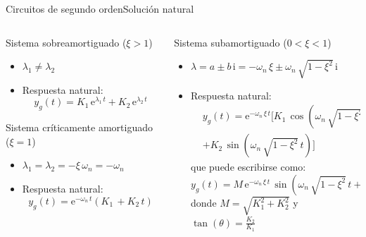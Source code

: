 \documentclass[aspectratio=169, xcolor={usenames,svgnames,dvipsnames}]{beamer}
\begin{document}
\begin{frame}{Circuitos de segundo orden}{Solución natural}
\begin{columns}
\begin{column}{0.5\linewidth}
\begin{center}
  \alert{Sistema sobreamortiguado ($\xi>1$)}
  \begin{itemize}
      \item $\lambda_1\neq\lambda_2$
      \item Respuesta natural:
      \begin{equation*}
	 y_g(t)=K_1\,\mathrm{e}^{\lambda_1\,t}+K_2\,\mathrm{e}^{\lambda_2\,t}   
	\end{equation*}
  \end{itemize}

\alert{Sistema críticamente amortiguado ($\xi=1$)}  
\begin{itemize}
    \item $\lambda_1=\lambda_2=-\xi\,\omega_n=-\omega_n$
    \item Respuesta natural: 
    \begin{equation*}
	 y_g(t)=\mathrm{e}^{-\omega_n\,t}(K_1\,+K_2\,t)   
	\end{equation*}
\end{itemize}
\end{center}
\end{column}
\begin{column}{0.5\linewidth}
\begin{center}
    \alert{Sistema subamortiguado ($0<\xi<1$)}
\begin{itemize}
    \item $\lambda=a\pm b\,\mathrm{i}=-\omega_n\,\xi\pm \omega_n\,\sqrt{1-\xi^2}\,\mathrm{i}$
    \item Respuesta natural: 
    \begin{align*}
	 &y_g(t)=\mathrm{e}^{-\omega_n\,\xi \,t}[K_1\,\cos(\omega_n\,\sqrt{1-\xi^2}\,t)+\\
	 &+K_2\,\sin(\omega_n\,\sqrt{1-\xi^2}\,t)]  
	\end{align*}
	que puede escribirse como: 
	\begin{equation*}
	 y_g(t)=M\,\mathrm{e}^{-\omega_n\,\xi \,t}\,\sin\left(\omega_n\,\sqrt{1-\xi^2}\,t + \theta \right)
	\end{equation*}
	donde $M=\sqrt{K_1^2+K_2^2}$ y $\tan(\theta)=\frac{K_2}{K_1}$
\end{itemize}
	
\end{center}
\end{column}
\end{columns}
\end{frame}
\end{document}

